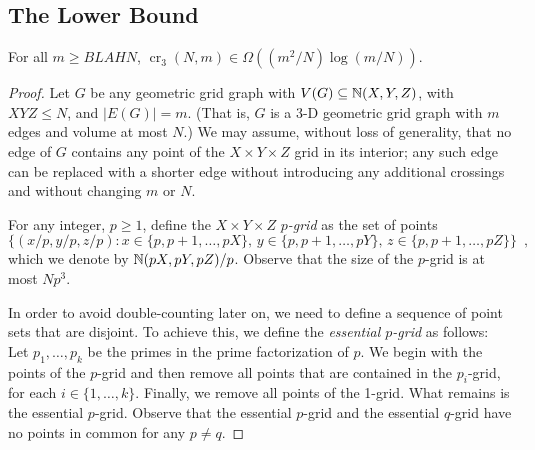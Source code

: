 \documentclass{patmorin}
\newcommand{\n}{N}
\DeclareMathOperator{\crs}{cr}
\begin{document}
\subsection{The Lower Bound}


\begin{thm}
  For all $m\ge BLAH\n$, $\crs_3(\n,m) \in \Omega((m^2/\n)\log(m/\n))$.
\end{thm}

\begin{proof}
  Let $G$ be any geometric grid graph with $V(G)\subseteq\mathbb{N}(X,Y,Z)$,
  with $XYZ\le\n$, and $|E(G)|=m$. (That is, $G$ is a 3-D geometric
  grid graph with $m$ edges and volume at most $\n$.)  We may assume,
  without loss of generality, that no edge of $G$ contains any point
  of the $X\times Y\times Z$ grid in its interior; any such edge can
  be replaced with a shorter edge without introducing any additional
  crossings and without changing $m$ or $\n$.

  For any integer, $p\ge 1$, define the $X\times Y\times Z$
  \emph{$p$-grid} as the set of points
  \[
    \{(x/p,y/p,z/p): x\in\{p,p+1,\ldots,pX\},\,
    y\in\{p,p+1,\ldots,pY\},\, z\in\{p,p+1,\ldots,pZ\}\} \enspace ,
  \]
  which we denote by $\mathbb{N}(pX,pY,pZ)/p$.  Observe that the size of the
  $p$-grid is at most $\n p^3$.

  In order to avoid double-counting later on, we need to define a
  sequence of point sets that are disjoint.  To achieve this, we define
  the \emph{essential $p$-grid} as follows: Let $p_1,\ldots,p_k$ be the
  primes in the prime factorization of $p$.  We begin with the points
  of the $p$-grid and then remove all points that are contained in
  the $p_i$-grid, for each $i\in\{1,\ldots,k\}$.  Finally, we remove
  all points of the 1-grid.  What remains is the essential $p$-grid.
  Observe that the essential $p$-grid and the essential $q$-grid have no
  points in common for any $p\neq q$.

%
%


\end{proof}
\end{document}
